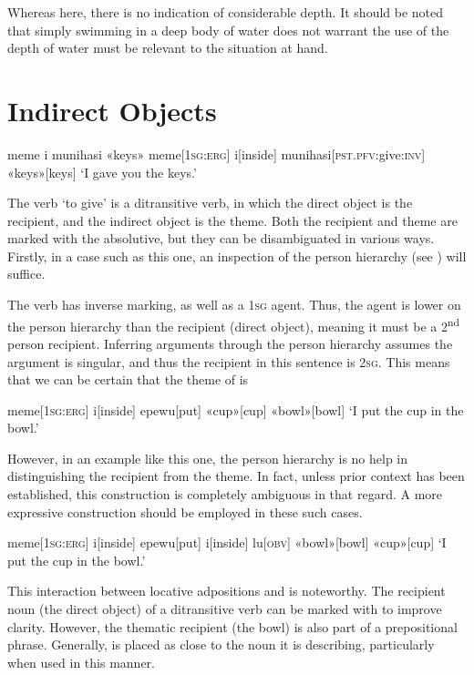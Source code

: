Whereas here, there is no indication of considerable depth. It should be noted that simply swimming in a deep body of water does not warrant the use of  the depth of water must be relevant to the situation at hand.

\section{Indirect Objects}
\ex
\begingl
\glpreamble meme i munihasi «keys»
\endpreamble
meme[\textsc{1sg:erg}]
i[inside]
munihasi[\textsc{pst.pfv:}give\textsc{:inv}]
«keys»[keys]
\glft `I gave you the keys.'
\endgl
\xe

The verb  `to give' is a ditransitive verb, in which the direct object is the recipient, and the indirect object is the theme. Both the recipient and theme are marked with the absolutive, but they can be disambiguated in various ways. Firstly, in a case such as this one, an inspection of the person hierarchy (see ) will suffice.

The verb  has inverse marking, as well as a \textsc{1sg} agent. Thus, the agent is lower on the person hierarchy than the recipient (direct object), meaning it must be a 2\textsuperscript{nd} person recipient. Inferring arguments through the person hierarchy assumes the argument is singular, and thus the recipient in this sentence is \textsc{2sg}. This means that we can be certain that the theme of  is 

\ex
\begingl
\glpreamble
\pronounced{}\endpreamble
meme[\textsc{1sg:erg}]
i[inside]
epewu[put]
«cup»[cup]
«bowl»[bowl]
\glft `I put the cup in the bowl.'
\endgl
\xe

However, in an example like this one, the person hierarchy is no help in distinguishing the recipient from the theme. In fact, unless prior context has been established, this construction is completely ambiguous in that regard. A more expressive construction should be employed in these such cases.

\ex
\begingl
\glpreamble
\pronounced{}\endpreamble
meme[\textsc{1sg:erg}]
i[inside]
epewu[put]
i[inside]
lu[\textsc{obv}]
«bowl»[bowl]
«cup»[cup]
\glft `I put the cup in the bowl.'
\endgl
\xe

This interaction between locative adpositions and  is noteworthy. The recipient noun (the direct object) of a ditransitive verb can be marked with  to improve clarity. However, the thematic recipient (the bowl) is also part of a prepositional phrase. Generally,  is placed as close to the noun it is describing, particularly when used in this manner.

